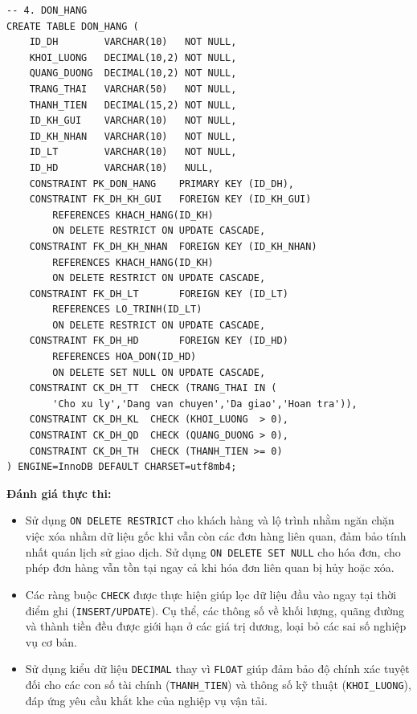 \documentclass[11pt]{report}
\begin{document}
\begin{verbatim}
-- 4. DON_HANG
CREATE TABLE DON_HANG (
    ID_DH        VARCHAR(10)   NOT NULL,
    KHOI_LUONG   DECIMAL(10,2) NOT NULL,
    QUANG_DUONG  DECIMAL(10,2) NOT NULL,
    TRANG_THAI   VARCHAR(50)   NOT NULL,
    THANH_TIEN   DECIMAL(15,2) NOT NULL,
    ID_KH_GUI    VARCHAR(10)   NOT NULL,
    ID_KH_NHAN   VARCHAR(10)   NOT NULL,
    ID_LT        VARCHAR(10)   NOT NULL,
    ID_HD        VARCHAR(10)   NULL,
    CONSTRAINT PK_DON_HANG    PRIMARY KEY (ID_DH),
    CONSTRAINT FK_DH_KH_GUI   FOREIGN KEY (ID_KH_GUI)
        REFERENCES KHACH_HANG(ID_KH)
        ON DELETE RESTRICT ON UPDATE CASCADE,
    CONSTRAINT FK_DH_KH_NHAN  FOREIGN KEY (ID_KH_NHAN)
        REFERENCES KHACH_HANG(ID_KH)
        ON DELETE RESTRICT ON UPDATE CASCADE,
    CONSTRAINT FK_DH_LT       FOREIGN KEY (ID_LT)
        REFERENCES LO_TRINH(ID_LT)
        ON DELETE RESTRICT ON UPDATE CASCADE,
    CONSTRAINT FK_DH_HD       FOREIGN KEY (ID_HD)
        REFERENCES HOA_DON(ID_HD)
        ON DELETE SET NULL ON UPDATE CASCADE,
    CONSTRAINT CK_DH_TT  CHECK (TRANG_THAI IN (
        'Cho xu ly','Dang van chuyen','Da giao','Hoan tra')),
    CONSTRAINT CK_DH_KL  CHECK (KHOI_LUONG  > 0),
    CONSTRAINT CK_DH_QD  CHECK (QUANG_DUONG > 0),
    CONSTRAINT CK_DH_TH  CHECK (THANH_TIEN >= 0)
) ENGINE=InnoDB DEFAULT CHARSET=utf8mb4;
\end{verbatim}

\textbf{Đánh giá thực thi:}
\begin{itemize}
    \item Sử dụng \texttt{ON DELETE RESTRICT} cho khách hàng và lộ trình nhằm ngăn chặn việc xóa nhầm dữ liệu gốc khi vẫn còn các đơn hàng liên quan, đảm bảo tính nhất quán lịch sử giao dịch. Sử dụng \texttt{ON DELETE SET NULL} cho hóa đơn, cho phép đơn hàng vẫn tồn tại ngay cả khi hóa đơn liên quan bị hủy hoặc xóa.
    
    \item Các ràng buộc \texttt{CHECK} được thực hiện giúp lọc dữ liệu đầu vào ngay tại thời điểm ghi (\texttt{INSERT/UPDATE}). Cụ thể, các thông số về khối lượng, quãng đường và thành tiền đều được giới hạn ở các giá trị dương, loại bỏ các sai số nghiệp vụ cơ bản.
    
    \item Sử dụng kiểu dữ liệu \texttt{DECIMAL} thay vì \texttt{FLOAT} giúp đảm bảo độ chính xác tuyệt đối cho các con số tài chính (\texttt{THANH\_TIEN}) và thông số kỹ thuật (\texttt{KHOI\_LUONG}), đáp ứng yêu cầu khắt khe của nghiệp vụ vận tải.
\end{itemize}
\end{document}
